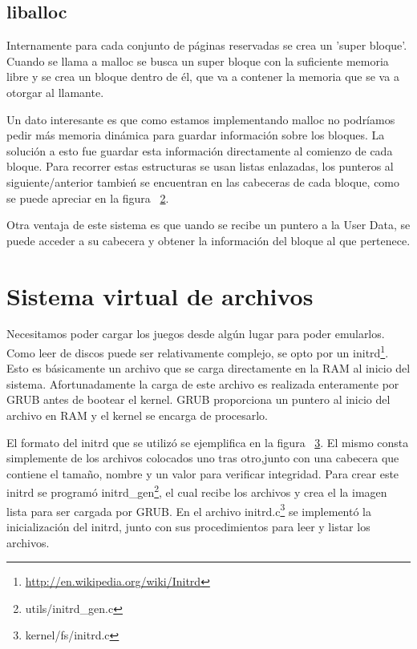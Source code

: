 \begin{figure}[H]\caption{\label{fig:bitmap}}
\centering\def\svgwidth{\columnwidth}

\end{figure}
\subsection{liballoc}
Internamente para cada conjunto de páginas reservadas se crea un 'super bloque'. Cuando se llama a malloc se busca un super bloque con la suficiente memoria libre y se crea un bloque dentro de él, que va a contener la memoria que se va a otorgar al llamante.

Un dato interesante es que como estamos implementando malloc no podríamos pedir más memoria dinámica para guardar información sobre los bloques. La solución a esto fue guardar esta información directamente al comienzo de cada bloque. 
Para recorrer estas estructuras se usan listas enlazadas, los punteros al siguiente/anterior tambień se encuentran en las cabeceras de cada bloque, como se puede apreciar en la figura ~\ref{fig:liballoc}.

\begin{figure}[H]\caption{\label{fig:liballoc}}
\centering\def\svgwidth{\columnwidth}
\small
\end{figure}

Otra ventaja de este sistema es que uando se recibe un puntero a la User Data, se puede acceder a su cabecera y obtener la información del bloque al que pertenece.

\section{Sistema virtual de archivos}\label{sec:vfs}
Necesitamos poder cargar los juegos desde algún lugar para poder emularlos. Como leer de discos puede ser relativamente complejo, se opto por un initrd\footnote{\url{http://en.wikipedia.org/wiki/Initrd}}. Esto es básicamente un archivo que se carga directamente en la RAM al inicio del sistema. Afortunadamente la carga de este archivo es realizada enteramente por GRUB antes de bootear el kernel. GRUB proporciona un puntero al inicio del archivo en RAM y el kernel se encarga de procesarlo.
\begin{figure}[H]\caption{\label{fig:initrd}}
\centering\def\svgwidth{\columnwidth}
\small
\end{figure}
 El formato del initrd que se utilizó se ejemplifica en la figura ~\ref{fig:initrd}. El mismo consta simplemente de los archivos colocados uno tras otro,junto con una cabecera que contiene el tamaño, nombre y un valor para verificar integridad.
 Para crear este initrd se programó initrd\_gen\footnote{utils/initrd\_gen.c}, el cual recibe los archivos y crea el la imagen lista para ser cargada por GRUB. En el archivo initrd.c\footnote{kernel/fs/initrd.c} se implementó la inicialización del initrd, junto con sus procedimientos para leer y listar los archivos.
 

